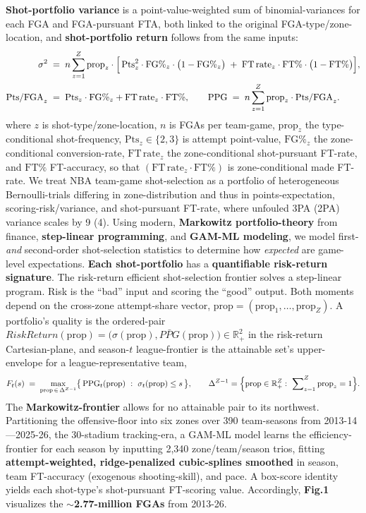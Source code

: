 \documentclass[10pt]{article}
\newcommand{\sect}[1]{\vspace{0pt}\noindent{\bfseries\color{navy}#1}\par\nobreak\vspace{-1pt}}
\newcommand{\Pts}{\mathrm{Pts}}
\newcommand{\FGpct}{\mathrm{FG\%}}
\newcommand{\FTpct}{\mathrm{FT\%}}
\newcommand{\FTrate}{\mathrm{FT\,rate}}
\newcommand{\prop}{\mathrm{prop}}
\newcommand{\PPG}{\mathrm{PPG}}
\newcommand{\PtsFGA}{\mathrm{Pts/FGA}}
\begin{document}
\sect{2. Methods}
\noindent
\textbf{Shot-portfolio variance} is a point-value-weighted sum of binomial-variances for each FGA and FGA-pursuant FTA, both linked to the original FGA-type/zone-location, and \textbf{shot-portfolio return} follows from the same inputs:
\begin{align}
\sigma^{2}\;&=\;n\sum_{z=1}^{Z}\prop_{z}\cdot\Bigl[\,\Pts_{z}^{2}\cdot\FGpct_{z}\cdot\bigl(1-\FGpct_{z}\bigr)\;+\;\FTrate_{z}\cdot\FTpct\cdot\bigl(1-\FTpct\bigr)\Bigr],\\[1pt]
\PtsFGA_{z}\;&=\;\Pts_{z}\cdot\FGpct_{z}+\FTrate_{z}\cdot\FTpct,\qquad
\PPG\;=\;n\sum_{z=1}^{Z}\prop_{z}\cdot\PtsFGA_{z}.
\end{align}
where $z$ is shot-type/zone-location, $n$ is FGAs per team-game, $\prop_{z}$ the type-conditional shot-frequency, $\Pts_{z}\in\{2,3\}$ is attempt point-value, $\FGpct_{z}$ the zone-conditional conversion-rate, $\FTrate_{z}$ the zone-conditional shot-pursuant FT-rate, and $\FTpct$ FT-accuracy, so that $(\FTrate_{z}\cdot\FTpct)$ is zone-conditional made FT-rate.
We treat NBA team-game shot-selection as a portfolio of heterogeneous Bernoulli-trials differing in zone-distribution and thus in points-expectation, scoring-risk/variance, and shot-pursuant FT-rate, where unfouled 3PA (2PA) variance scales by 9 (4). Using modern, \textbf{Markowitz portfolio-theory} from finance, \textbf{step-linear programming}, and \textbf{GAM-ML modeling}, we model first- \emph{and} second-order shot-selection statistics to determine how \emph{expected} are game-level expectations. \textbf{Each shot-portfolio} has a \textbf{quantifiable risk-return signature}. The risk-return efficient shot-selection frontier solves a step-linear program. Risk is the ``bad'' input and scoring the ``good'' output. Both moments depend on the cross-zone attempt-share vector, $\prop=(\prop_{1},\dots,\prop_{Z})$. A portfolio's quality is the ordered-pair $RiskReturn(\prop)=\bigl(\sigma(\prop),\bar{PPG}(\prop)\bigr)\in\mathbb{R}_{+}^{2}$ in the risk-return Cartesian-plane, and season-$t$ league-frontier is the attainable set's upper-envelope for a league-representative team,
\begin{equation}
F_{t}(s)\;=\;\max_{\prop\,\in\,\Delta^{Z-1}}\bigl\{\,\PPG_{t}(\prop)\ :\ \sigma_{t}(\prop)\le s\,\bigr\},
\qquad
\Delta^{Z-1}=\Bigl\{\prop\in\mathbb{R}_{+}^{Z}:\ \sum\nolimits_{z=1}^{Z}\prop_{z}=1\Bigr\}.
\end{equation}
The \textbf{Markowitz-frontier} allows for no attainable pair to its northwest. Partitioning the offensive-floor into six zones over 390 team-seasons from 2013-14---2025-26, the 30-stadium tracking-era, a GAM-ML model learns the efficiency-frontier for each season by inputting 2{,}340 zone/team/season trios, fitting \textbf{attempt-weighted, ridge-penalized cubic-splines smoothed} in season, team FT-accuracy (exogenous shooting-skill), and pace. A box-score identity yields each shot-type's shot-pursuant FT-scoring value. Accordingly, \textbf{Fig.1} visualizes the \textbf{$\sim$2.77-million FGAs} from 2013-26. 
\end{document}
